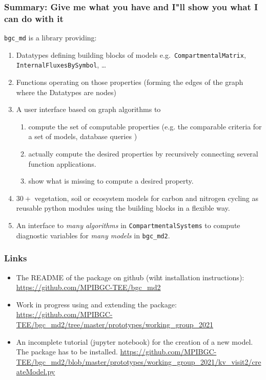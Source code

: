 \begin{frame}
\frametitle{Summary: Give me what you have and I"ll show you what I can do with it} 
  \texttt{bgc\_md} is a library providing:
  \begin{enumerate}
    \item
      Datatypes defining building blocks of models e.g.\ \texttt{CompartmentalMatrix}, \texttt{InternalFluxesBySymbol}, \dots     
    \item
      Functions operating on those properties (forming the edges of the graph where the Datatypes are nodes) 
    \item
      A user interface based on graph algorithms to  
    \begin{enumerate}
      \item
        compute the set of computable properties (e.g. the comparable criteria for a set of models, database queries ) 
      \item
        actually compute the desired properties by recursively connecting several function applications.
      \item
        show what is missing to compute a desired property.
    \end{enumerate}
    \item
    $30+$ vegetation, soil or ecosystem models for carbon and nitrogen cycling
      as reusable python modules using the building blocks in a flexible way. 
    \item 
      An interface to \emph{many  algorithms} in \texttt{CompartmentalSystems} to compute diagnostic variables
      for \emph{many models} in \texttt{bgc\_md2}.
  \end{enumerate}
\end{frame}

\begin{frame}
	\frametitle{Links}
  \begin{itemize}
    \item
      The README of the package on github (wiht installation instructions):
      \url{https://github.com/MPIBGC-TEE/bgc_md2}
    \item
      Work in progress using and extending the package:
      \url{https://github.com/MPIBGC-TEE/bgc_md2/tree/master/prototypes/working_group_2021}
    \item
      An incomplete tutorial (jupyter notebook) for the creation of a new model.
      The package has to be installed.
      \url{https://github.com/MPIBGC-TEE/bgc_md2/blob/master/prototypes/working_group_2021/kv_visit2/createModel.py}
  \end{itemize}
\end{frame}


